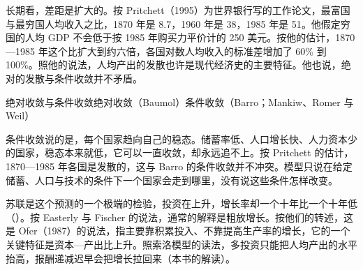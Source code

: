 
长期看，差距是扩大的。按 Pritchett（1995）为世界银行写的工作论文，最富国与最穷国人均收入之比，1870 年是 8.7，1960 年是 38，1985 年是 51\cite{pritchett1995}。他假定穷国的人均 GDP 不会低于按 1985 年购买力平价计的 250 美元\cite{pritchett1995}。按他的估计，1870—1985 年这个比扩大到约六倍，各国对数人均收入的标准差增加了 60\% 到 100\%\cite{pritchett1995}。照他的说法，人均产出的发散也许是现代经济史的主要特征\cite{pritchett1995}。他也说，绝对的发散与条件收敛并不矛盾\cite{pritchett1995}。

\begin{compare}{绝对收敛与条件收敛}{绝对收敛（Baumol）}{条件收敛（Barro；Mankiw、Romer 与 Weil）}
\end{compare}

\begin{pitfall}[条件收敛说穷国会追上富国]
条件收敛说的是，每个国家趋向自己的稳态。储蓄率低、人口增长快、人力资本少的国家，稳态本来就低，它可以一直收敛，却永远追不上。按 Pritchett 的估计，1870—1985 年各国是发散的，这与 Barro 的条件收敛并不冲突\cite{pritchett1995,barro1989}。模型只说在给定储蓄、人口与技术的条件下一个国家会走到哪里，没有说这些条件怎样改变。
\end{pitfall}

苏联是这个预测的一个极端的检验，投资在上升，增长率却一个十年比一个十年低（）。按 Easterly 与 Fischer 的说法，通常的解释是粗放增长\cite{ef1995}。按他们的转述，这是 Ofer（1987）的说法，指主要靠积累投入、不靠提高生产率的增长，它的一个关键特征是资本—产出比上升\cite{ef1995}。照索洛模型的读法，多投资只能把人均产出的水平抬高，报酬递减迟早会把增长拉回来（本书的解读）。

